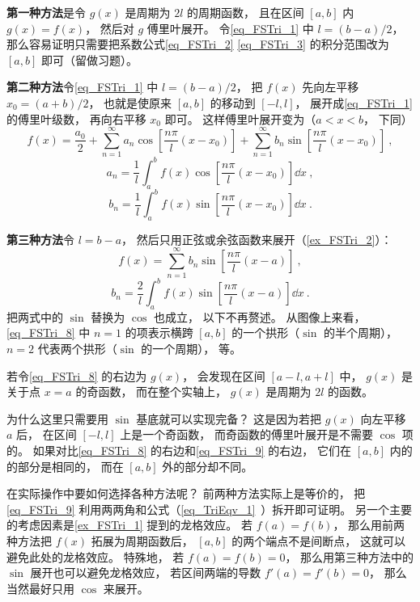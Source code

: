 \textbf{第一种方法}是令 $g(x)$ 是周期为 $2l$ 的周期函数， 且在区间 $[a, b]$ 内 $g(x) = f(x)$， 然后对 $g$ 傅里叶展开。 令\autoref{eq_FSTri_1} 中 $l = (b-a)/2$， 那么容易证明只需要把系数公式\autoref{eq_FSTri_2} \autoref{eq_FSTri_3} 的积分范围改为 $[a,b]$ 即可（留做习题）。

\textbf{第二种方法}令\autoref{eq_FSTri_1} 中 $l = (b-a)/2$， 把 $f(x)$ 先向左平移 $x_0 = (a+b)/2$， 也就是使原来 $[a,b]$ 的移动到 $[-l,l]$， 展开成\autoref{eq_FSTri_1} 的傅里叶级数， 再向右平移 $x_0$ 即可。 这样傅里叶展开变为（$a < x < b$， 下同）
\begin{equation}\label{eq_FSTri_9}
f(x) = \frac{a_0}{2} + \sum_{n = 1}^\infty a_n \cos [\frac{n\pi}{l}(x-x_0)] + \sum_{n = 1}^\infty b_n \sin [\frac{n\pi}{l}(x-x_0)]~,
\end{equation}
\begin{equation}
a_n = \frac{1}{l} \int_{a}^b f(x)\cos [\frac{n\pi}{l}(x-x_0)] \dd{x} ~,
\end{equation}
\begin{equation}
b_n = \frac{1}{l} \int_{a}^b f(x)\sin [\frac{n\pi}{l}(x-x_0)] \dd{x}~.
\end{equation}

\textbf{第三种方法}令 $l = b - a$， 然后只用正弦或余弦函数来展开（\autoref{ex_FSTri_2}）：
\begin{equation}\label{eq_FSTri_8}
f(x) = \sum_{n = 1}^\infty b_n \sin [\frac{n\pi}{l}(x-a)]~,
\end{equation}
\begin{equation}
b_n = \frac{2}{l} \int_{a}^b f(x)\sin [\frac{n\pi}{l}(x-a)] \dd{x}~.
\end{equation}
把两式中的 $\sin$ 替换为 $\cos$ 也成立， 以下不再赘述。 从图像上来看， \autoref{eq_FSTri_8} 中 $n=1$ 的项表示横跨 $[a,b]$ 的一个拱形（$\sin$ 的半个周期）， $n=2$ 代表两个拱形（$\sin$ 的一个周期）， 等。

若令\autoref{eq_FSTri_8} 的右边为 $g(x)$， 会发现在区间 $[a-l, a+l]$ 中，  $g(x)$ 是关于点 $x = a$ 的奇函数， 而在整个实轴上， $g(x)$ 是周期为 $2l$ 的函数。

为什么这里只需要用 $\sin$ 基底就可以实现完备？ 这是因为若把 $g(x)$ 向左平移 $a$ 后， 在区间 $[-l, l]$ 上是一个奇函数， 而奇函数的傅里叶展开是不需要 $\cos$ 项的。 如果对比\autoref{eq_FSTri_8} 的右边和\autoref{eq_FSTri_9} 的右边， 它们在 $[a, b]$ 内的的部分是相同的， 而在 $[a, b]$ 外的部分却不同。

在实际操作中要如何选择各种方法呢？ 前两种方法实际上是等价的， 把\autoref{eq_FSTri_9} 利用两两角和公式（\autoref{eq_TriEqv_1}~）拆开即可证明。 另一个主要的考虑因素是\autoref{ex_FSTri_1} 提到的龙格效应。 若 $f(a) = f(b)$， 那么用前两种方法把 $f(x)$ 拓展为周期函数后， $[a,b]$ 的两个端点不是间断点， 这就可以避免此处的龙格效应。 特殊地， 若 $f(a) = f(b) = 0$， 那么用第三种方法中的 $\sin$ 展开也可以避免龙格效应， 若区间两端的导数 $f'(a) = f'(b) = 0$， 那么当然最好只用 $\cos$ 来展开。

